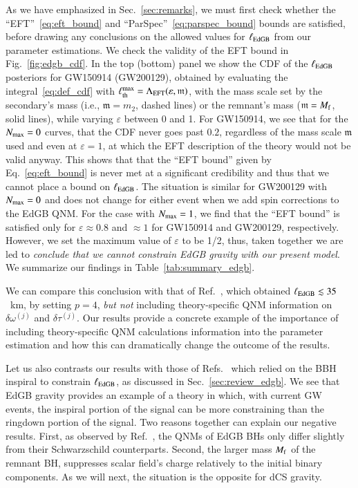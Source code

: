 \documentclass[twocolumn,
               prd,
               aps,
               superscriptaddress,
               tightenlines,
               nofootinbib,
               eqsecnum,
               amsfonts,
               amsmath,
               longbibliography]{revtex4-1}
\begin{document}
As we have emphasized in Sec.~\ref{sec:remarks}, we must first check whether the
``EFT''~\eqref{eq:eft_bound} and ``ParSpec''~\eqref{eq:parspec_bound} bounds
are satisfied, before drawing any conclusions on the allowed values for
$\ell_{\rm EdGB}$ from our parameter estimations.
%
We check the validity of the EFT bound in Fig.~\ref{fig:edgb_cdf}. In the top (bottom) panel we show
the CDF of the $\ell_{\rm EdGB}$ posteriors for GW150914 (GW200129), obtained
by evaluating the integral~\eqref{eq:def_cdf} with $\ell^{\rm max}_{\rm th} = \Lambda_{\rm EFT}(\varepsilon, \mathfrak{m})$,
with the mass scale set by the secondary's mass (i.e., $\mathfrak{m} = m_2$, dashed lines) or
the remnant's mass ($\mathfrak{m} = M_{\rm f}$, solid lines), while varying $\varepsilon$ between 0 and 1.
%
For GW150914, we see that for the $N_{\rm max} = 0$ curves, that the CDF never goes
past $0.2$, regardless of the mass scale $\mathfrak{m}$ used and even at $\varepsilon =
1$, at which the EFT description of the theory would not be valid anyway.
%
This shows that that the ``EFT bound'' given by Eq.~\eqref{eq:eft_bound} is
never met at a significant credibility and thus that we cannot place a bound on
$\ell_{\rm EdGB}$.
%
The situation is similar for GW200129 with $N_{\rm max} = 0$ and does not
change for either event when we add spin corrections to the EdGB QNM.
%
For the case with $N_{\rm max} = 1$, we find that the ``EFT bound'' is satisfied
only for $\varepsilon \approx 0.8$ and $\approx1$ for GW150914 and GW200129, respectively.
However, we set the maximum value of $\varepsilon$ to be 1/2, thus,
taken together we are led to \emph{conclude that we cannot constrain EdGB gravity with our
present model}.
%
We summarize our findings in Table~\ref{tab:summary_edgb}.

We can compare this conclusion with that of Ref.~\cite{Carullo:2021dui}, which obtained $\ell_{\rm EdGB} \lesssim 35$~km,
by setting $p=4$, \emph{but not} including theory-specific QNM information on $\delta \omega^{(j)}$ and $\delta \tau^{(j)}$.
%
Our results provide a concrete example of the importance of including
theory-specific QNM calculations information into the parameter estimation
and how this can dramatically change the outcome of the results.

Let us also contrasts our results with those of Refs.~\cite{Nair:2019iur,Perkins:2021mhb,Lyu:2022gdr}
which relied on the BBH inspiral to constrain $\ell_{\rm EdGB}$, as discussed in Sec.~\ref{sec:review_edgb}.
%
We see that EdGB gravity provides an example of a theory in which, with current GW events, the inspiral portion
of the signal can be more constraining than the ringdown portion of the signal.
%
Two reasons together can explain our negative results. First, as observed by
Ref.~\cite{Blazquez-Salcedo:2016enn}, the QNMs of EdGB BHs only differ slightly
from their Schwarzschild counterparts. Second, the larger mass $M_{\rm f}$ of the
remnant BH, suppresses scalar field's charge relatively to the initial binary
components.
%
As we will next, the situation is the opposite for dCS gravity.
\end{document}
